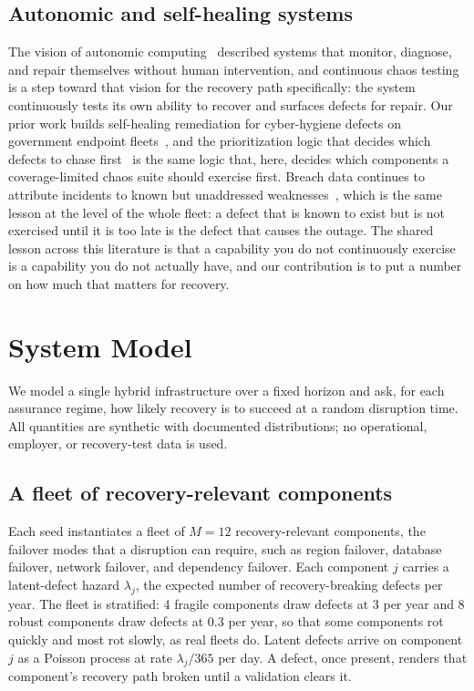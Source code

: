 \documentclass[journal]{IEEEtran}
\begin{document}
\subsection{Autonomic and self-healing systems}
The vision of autonomic computing~\cite{kephart2003vision} described systems that monitor, diagnose,
and repair themselves without human intervention, and continuous chaos testing is a step toward that
vision for the recovery path specifically: the system continuously tests its own ability to recover
and surfaces defects for repair. Our prior work builds self-healing remediation for cyber-hygiene
defects on government endpoint fleets~\cite{paper10autoheal}, and the prioritization logic that
decides which defects to chase first~\cite{paper4hygieneprio} is the same logic that, here, decides
which components a coverage-limited chaos suite should exercise first. Breach data continues to
attribute incidents to known but unaddressed weaknesses~\cite{verizon2026dbir}, which is the same
lesson at the level of the whole fleet: a defect that is known to exist but is not exercised until
it is too late is the defect that causes the outage. The shared lesson across this literature is
that a capability you do not continuously exercise is a capability you do not actually have, and our
contribution is to put a number on how much that matters for recovery.

\section{System Model}
We model a single hybrid infrastructure over a fixed horizon and ask, for each assurance regime, how
likely recovery is to succeed at a random disruption time. All quantities are synthetic with
documented distributions; no operational, employer, or recovery-test data is used.

\subsection{A fleet of recovery-relevant components}
Each seed instantiates a fleet of $M = 12$ recovery-relevant components, the failover modes that a
disruption can require, such as region failover, database failover, network failover, and dependency
failover. Each component $j$ carries a latent-defect hazard $\lambda_j$, the expected number of
recovery-breaking defects per year. The fleet is stratified: 4 fragile components draw defects at
3 per year and 8 robust components draw defects at 0.3 per year, so that some components rot quickly
and most rot slowly, as real fleets do. Latent defects arrive on component $j$ as a Poisson process
at rate $\lambda_j / 365$ per day. A defect, once present, renders that component's recovery path
broken until a validation clears it.
\end{document}
